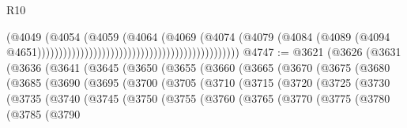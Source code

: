 \begin{lexlean}{R10}
\begin{coremodule}
                                                                              (@4049
                                                                                (@4054
                                                                                  (@4059
                                                                                    (@4064
                                                                                      (@4069
                                                                                        (@4074
                                                                                          (@4079
                                                                                            (@4084
                                                                                              (@4089
                                                                                                (@4094
                                                                                                  @4651)))))))))))))))))))))))))))))))))))))))))))))))
@4747 := @3621
    (@3626
      (@3631
        (@3636
          (@3641
            (@3645
              (@3650
                (@3655
                  (@3660
                    (@3665
                      (@3670
                        (@3675
                          (@3680
                            (@3685
                              (@3690
                                (@3695
                                  (@3700
                                    (@3705
                                      (@3710
                                        (@3715
                                          (@3720
                                            (@3725
                                              (@3730
                                                (@3735
                                                  (@3740
                                                    (@3745
                                                      (@3750
                                                        (@3755
                                                          (@3760
                                                            (@3765
                                                              (@3770
                                                                (@3775
                                                                  (@3780
                                                                    (@3785
                                                                      (@3790

\end{coremodule}
\end{lexlean}
